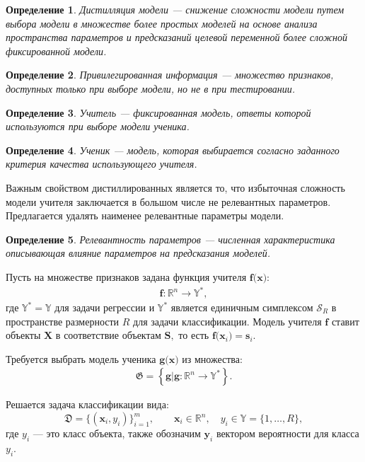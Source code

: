 \documentclass{dissert}
\newtheorem{definition}{Определение}
\begin{document}
\begin{definition}
Дистилляция модели --- снижение сложности модели путем выбора модели в множестве более простых моделей на основе анализа пространства параметров и предсказаний целевой переменной более сложной фиксированной модели.
\end{definition}

\begin{definition}
Привилегированная информация --- множество признаков, доступных только при выборе модели, но не в при тестировании.
\end{definition}

\begin{definition}
Учитель --- фиксированная модель, ответы которой используются при выборе модели ученика.
\end{definition}

\begin{definition}
Ученик --- модель, которая выбирается согласно заданного критерия качества использующего учителя.
\end{definition}

Важным свойством дистиллированных является то, что избыточная сложность модели учителя заключается в большом числе не релевантных параметров. Предлагается удалять наименее релевантные параметры модели.
\begin{definition}
Релевантность параметров --- численная характеристика описывающая влияние параметров на предсказания моделей.
\end{definition}

Пусть на множестве признаков задана функция учителя $\mathbf{f}\bigr(\mathbf{x}\bigr)$:
\[
\begin{aligned}
\mathbf{f}:\mathbb{R}^{n} \to \mathbb{Y}^*,
\end{aligned}
\]
где $\mathbb{Y}^*=\mathbb{Y}$ для задачи регрессии и $\mathbb{Y}^*$ является единичным симплексом $\mathcal{S}_R$ в пространстве размерности $R$ для задачи классификации. Модель учителя $\mathbf{f}$ ставит объекты $\mathbf{X}$ в соответствие объектам $\mathbf{S},$ то есть  $\mathbf{f}\bigr(\mathbf{x}_i\bigr)=\mathbf{s}_i$.

Требуется выбрать модель ученика $\mathbf{g}\bigr(\mathbf{x}\bigr)$ из множества:
\[
\label{eq:st:G}
\begin{aligned}
\mathfrak{G} = \left\{\mathbf{g}| \mathbf{g}:\mathbb{R}^{n} \to \mathbb{Y}^*\right\}.
\end{aligned}
\]

Решается задача классификации вида:
\[
    \mathfrak{D} = \{\left(\mathbf{x}_i, y_i\right)\}_{i=1}^{m}, \qquad \mathbf{x}_i \in \mathbb{R}^{n}, \quad y_i \in \mathbb{Y}=\{1, \ldots, R\},
\]
где $y_i$ --- это класс объекта, также обозначим $\mathbf{y}_i$ вектором вероятности для класса $y_i$.
\end{document}
